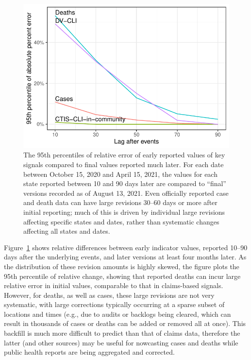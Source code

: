 \documentclass[9pt,twocolumn,twoside,lineno]{pnas-new}
\begin{document}
\begin{figure}[t]
  \includegraphics[width=\columnwidth]{fig/backfill-compare.pdf}
  \caption{The 95th percentiles of relative error of early reported values of
    key signals compared to final values reported much later. For each date
    between October 15, 2020 and April 15, 2021, the values for each state
    reported between 10 and 90 days later are compared to ``final'' versions
    recorded as of August 13, 2021. Even officially reported case and death data
    can have large revisions 30--60 days or more after initial reporting; much
    of this is driven by individual large revisions affecting specific states
    and dates, rather than systematic changes affecting all states and dates.}
  \label{fig:backfill-compare}
\end{figure}

Figure~\ref{fig:backfill-compare} shows relative differences between early
indicator values, reported 10--90 days after the underlying events, and later
versions at least four months later. As the distribution of these revision
amounts is highly skewed, the figure plots the 95th percentile of relative
change, showing that reported deaths can incur large relative error in initial
values, comparable to that in claims-based signals. However, for deaths, as well
as cases, these large revisions are not very systematic, with large corrections
typically occurring at a sparse subset of locations and times (e.g., due to 
audits or backlogs being cleared, which can result in thousands of cases or
deaths can be added or removed all at once). This backfill is much more
difficult to predict than that of claims data, therefore the latter (and other
sources) may be useful for nowcasting cases and deaths while public health
reports are being aggregated and corrected.
\end{document}
